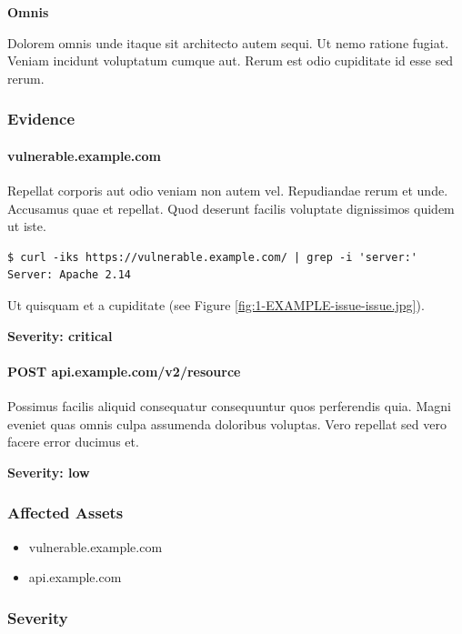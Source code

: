 \documentclass[a4paper]{article}
\def\tightlist{}
\begin{document}
\textbf{Omnis}

Dolorem omnis unde itaque sit architecto autem sequi.
Ut nemo ratione fugiat.
Veniam incidunt voluptatum cumque aut.
Rerum est odio cupiditate id esse sed rerum.


    \subsubsection{Evidence}

          \paragraph{vulnerable.example.com}

      Repellat corporis aut odio veniam non autem vel.
Repudiandae rerum et unde. Accusamus quae et repellat.
Quod deserunt facilis voluptate dignissimos quidem ut iste.

\begin{lstlisting}
$ curl -iks https://vulnerable.example.com/ | grep -i 'server:'
Server: Apache 2.14
\end{lstlisting}

Ut quisquam et a cupiditate (see Figure \ref{fig:1-EXAMPLE-issue-issue.jpg}).

\textbf{Severity: critical}

          \paragraph{POST api.example.com/v2/resource}

      Possimus facilis aliquid consequatur consequuntur quos perferendis quia.
Magni eveniet quas omnis culpa assumenda doloribus voluptas.
Vero repellat sed vero facere error ducimus et.

\textbf{Severity: low}

    
    \subsubsection{Affected Assets}

    \begin{itemize}
\tightlist
\item
  vulnerable.example.com
\item
  api.example.com
\end{itemize}


    \subsubsection{Severity}
\end{document}
